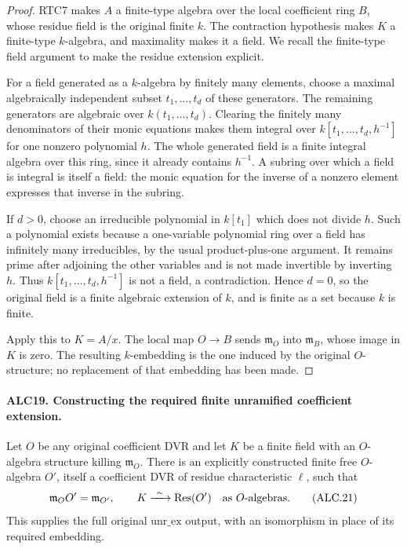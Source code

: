 \documentclass[11pt,a4paper]{article}
\numberwithin{equation}{section}
\theoremstyle{remark}\newtheorem{remark}[theorem]{Remark}
\begin{document}
\begin{proof}
RTC7 makes \(A\) a finite-type algebra over the local
coefficient ring \(B\), whose residue field is the original
finite \(k\).  The contraction hypothesis makes \(K\)
a finite-type \(k\)-algebra, and maximality makes it a
field.  We recall the finite-type field argument to make
the residue extension explicit.

For a field generated as a \(k\)-algebra by finitely many
elements, choose a maximal algebraically independent subset
\(t_1,\ldots,t_d\) of these generators.  The remaining
generators are algebraic over \(k(t_1,\ldots,t_d)\).
Clearing the finitely many denominators of their monic
equations makes them integral over
\(k[t_1,\ldots,t_d,h^{-1}]\) for one nonzero polynomial
\(h\).  The whole generated field is a finite integral
algebra over this ring, since it already contains \(h^{-1}\).
A subring over which a field is integral is itself a field:
the monic equation for the inverse of a nonzero element
expresses that inverse in the subring.

If \(d>0\), choose an irreducible polynomial in \(k[t_1]\)
which does not divide \(h\).  Such a polynomial exists
because a one-variable polynomial ring over a field has
infinitely many irreducibles, by the usual product-plus-one
argument.  It remains prime after adjoining the other
variables and is not made invertible by inverting \(h\).
Thus \(k[t_1,\ldots,t_d,h^{-1}]\) is not a field, a
contradiction.  Hence \(d=0\), so the original field is
a finite algebraic extension of \(k\), and is finite as
a set because \(k\) is finite.

Apply this to \(K=A/x\).  The local map \(O\to B\)
sends \(\mathfrak m_O\) into \(\mathfrak m_B\), whose
image in \(K\) is zero.  The resulting \(k\)-embedding
is the one induced by the original \(O\)-structure; no
replacement of that embedding has been made.
\end{proof}

\paragraph{ALC19. Constructing the required finite unramified coefficient extension.}
\label{claim:ALC19}
Let \(O\) be any original coefficient DVR and let \(K\)
be a finite field with an \(O\)-algebra structure killing
\(\mathfrak m_O\).  There is an explicitly constructed
finite free \(O\)-algebra \(O'\), itself a coefficient
DVR of residue characteristic \(\ell\), such that
\[
 \mathfrak m_OO'=\mathfrak m_{O'},\qquad
              K\xrightarrow{\ \sim\ }\operatorname{Res}(O')
                  \quad\hbox{as \(O\)-algebras}.
                                                        \tag{ALC.21}
\]
This supplies the full original \(\mathrm{unr\_\allowbreak ex}\)
output, with an isomorphism in place of its required embedding.
\end{document}
